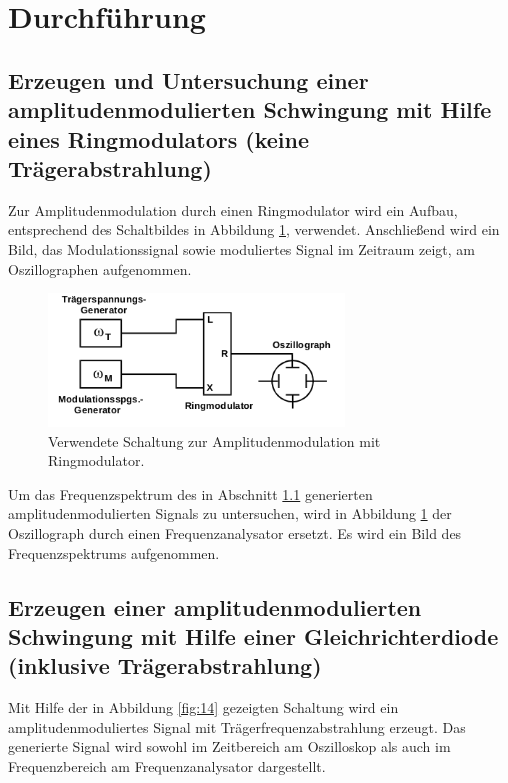 \newpage
\section{Durchführung}
\label{sec:Durchführung}

\FloatBarrier
\subsection{Erzeugen und Untersuchung einer amplitudenmodulierten Schwingung mit
Hilfe eines Ringmodulators (keine Trägerabstrahlung)}
\label{subsec:durchfuehrung_a}
Zur Amplitudenmodulation durch einen Ringmodulator wird ein Aufbau,
entsprechend des Schaltbildes in Abbildung \ref{fig:13}, verwendet.
Anschließend wird ein Bild, das Modulationssignal sowie moduliertes
Signal im Zeitraum zeigt, am Oszillographen aufgenommen.

\begin{figure}
  \centering
  \includegraphics[width=0.7\textwidth]{figures/a_d.png}
  \caption{Verwendete Schaltung zur Amplitudenmodulation mit Ringmodulator.\cite{sample}}
  \label{fig:13}
\end{figure}

\FloatBarrier
Um das Frequenzspektrum des in Abschnitt \ref{subsec:durchfuehrung_a} generierten
amplitudenmodulierten Signals zu untersuchen, wird in Abbildung
\ref{fig:13} der Oszillograph durch einen Frequenzanalysator ersetzt.
Es wird ein Bild des Frequenzspektrums
aufgenommen.

\FloatBarrier
\subsection{Erzeugen einer amplitudenmodulierten Schwingung
mit Hilfe einer Gleichrichterdiode (inklusive Trägerabstrahlung)}
\label{subsec:durchfuehrung_c}
Mit Hilfe der in Abbildung \ref{fig:14} gezeigten Schaltung
wird ein amplitudenmoduliertes Signal mit Trägerfrequenzabstrahlung erzeugt.
Das generierte Signal wird sowohl im Zeitbereich am Oszilloskop als auch
im Frequenzbereich am Frequenzanalysator dargestellt.

